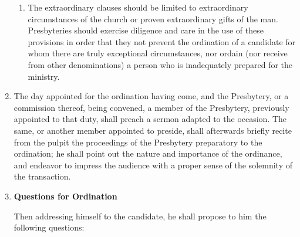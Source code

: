 \documentclass[
]{book}
\begin{document}
\begin{enumerate}
\begin{enumerate}
  \item
    The extraordinary clauses should be limited to extraordinary circumstances of the church or proven extraordinary gifts of the man. Presbyteries should exercise diligence and care in the use of these provisions in order that they not prevent the ordination of a candidate for whom there are truly exceptional circumstances, nor ordain (nor receive from other denominations) a person who is inadequately prepared for the ministry.
  \end{enumerate}
\item
  The day appointed for the ordination having come, and the Presbytery, or a commission thereof, being convened, a member of the Presbytery, previously appointed to that duty, shall preach a sermon adapted to the occasion. The same, or another member appointed to preside, shall afterwards briefly recite from the pulpit the proceedings of the Presbytery preparatory to the ordination; he shall point out the nature and importance of the ordinance, and endeavor to impress the audience with a proper sense of the solemnity of the transaction.
\item
  \textbf{Questions for Ordination}

  Then addressing himself to the candidate, he shall propose to him the following questions:


\end{enumerate}
\end{document}
